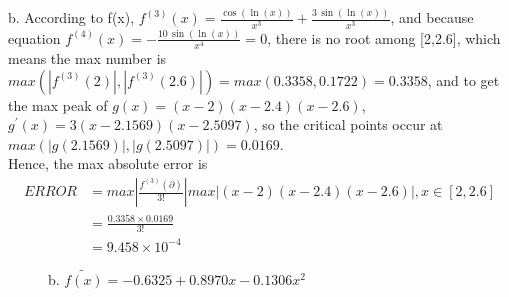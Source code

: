 \documentclass{article}
\begin{document}
b.
According to f(x), $f^{(3)}(x)=\frac{\cos\left(\ln\left(x\right)\right)}{x^3}+\frac{3\,\sin\left(\ln\left(x\right)\right)}{x^3}$,
and because equation $f^{(4)}(x)=-\frac{10\,\sin\left(\ln\left(x\right)\right)}{x^4}=0$, there is no root among [2,2.6], which means the max number is $max(|f^{(3)}(2)|,|f^{(3)}(2.6)|)=max(0.3358,0.1722)=0.3358$, and to get the max peak of $g(x)=(x-2)(x-2.4)(x-2.6)$, $g^{'}(x)=3(x-2.1569)(x-2.5097)$, so the critical points occur at $max(|g(2.1569)|,|g(2.5097)|)=0.0169$. \\
Hence, the max absolute error is 
\begin{equation}
\begin{aligned}
    ERROR&=max|\frac{f^{(3)}(\partial)}{3!}| max|(x-2)(x-2.4)(x-2.6)|, x \in [2,2.6] \\
    &=\frac{0.3358 \times 0.0169}{3!} \\
    &=9.458 \times 10^{-4}
    \nonumber
\end{aligned}
\end{equation}

\begin{figure}[b]
\centering
{}%
%
\caption{b. $\widetilde{f(x)}=-0.6325+0.8970x-0.1306x^2$}
\end{figure}
\end{document}
